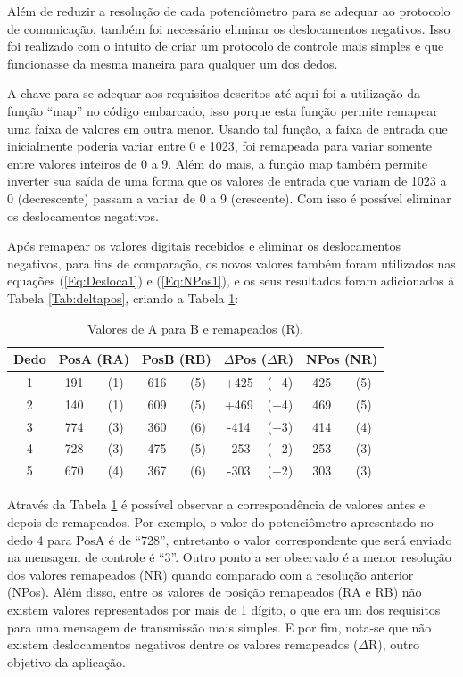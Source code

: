 \documentclass[
	12pt,				%
	openright,			%
	oneside,			%
	a4paper,			%
	english,			%
	brazil				%
	]{abntex2}
\begin{document}
		Além de reduzir a resolução de cada potenciômetro para se adequar ao protocolo de comunicação, também foi necessário eliminar os deslocamentos negativos. Isso foi realizado com o intuito de criar um protocolo de controle mais simples e que funcionasse da mesma maneira para qualquer um dos dedos.

	 A chave para se adequar aos requisitos descritos até aqui foi a utilização da função ``map'' no código embarcado, isso porque esta função permite remapear uma faixa de valores em outra menor. Usando tal função, a faixa de entrada que inicialmente poderia variar entre 0 e 1023, foi remapeada para variar somente entre valores inteiros de 0 a 9. Além do mais, a função map também permite inverter sua saída de uma forma que os valores de entrada que variam de 1023 a 0 (decrescente) passam a variar de 0 a 9 (crescente). Com isso é possível eliminar os deslocamentos negativos.

	 Após remapear os valores digitais recebidos e eliminar os deslocamentos negativos, para fins de comparação, os novos valores também foram utilizados nas equações (\ref{Eq:Desloca1}) e (\ref{Eq:NPos1}), e os seus resultados foram adicionados à Tabela \ref{Tab:deltapos}, criando a Tabela \ref{Tab:deltaremap}:


	\begin{table}[H]
  	\centering
		\caption{Valores de A para B e remapeados (R).}
    \begin{tabular}{c|cc|cc|cc|cc}
      \midrule
			Dedo	&\multicolumn{2}{c}{PosA	(RA)} 	&\multicolumn{2}{c}{PosB (RB)}	&\multicolumn{2}{c}{$\Delta$Pos	($\Delta$R)}	&\multicolumn{2}{c}{NPos	(NR)}	\\
      \midrule
			1 		& 191 & (1)		& 616 & (5)		& 		+425 & (+4)		&			425	& (5)		\\
			2 		& 140 & (1)		& 609 & (5)		& 		+469 & (+4)		&			469 &	(5)		\\
			3 		& 774 & (3)		& 360 & (6)		& 		-414 & (+3)		&			414	& (4)		\\
			4 		& 728 & (3)		& 475 & (5)		& 		-253 & (+2)		&			253	& (3)		\\
			5 		& 670 & (4)		& 367 & (6)		& 		-303 & (+2)		&			303 &	(3)		\\      
      \midrule
    \end{tabular}
    \label{Tab:deltaremap}
	\end{table}
	
		Através da Tabela \ref{Tab:deltaremap} é possível observar a correspondência de valores antes e depois de remapeados. Por exemplo, o valor do potenciômetro apresentado no dedo 4 para PosA é de ``728'', entretanto o valor correspondente que será enviado na mensagem de controle é ``3''. Outro ponto a ser observado é a menor resolução dos valores remapeados (NR) quando comparado com a resolução anterior (NPos). Além disso, entre os valores de posição remapeados (RA e RB) não existem valores representados por mais de 1 dígito, o que era um dos requisitos para uma mensagem de transmissão mais simples. E por fim, nota-se que não existem deslocamentos negativos dentre os valores remapeados ($\Delta$R), outro objetivo da aplicação.
\end{document}
